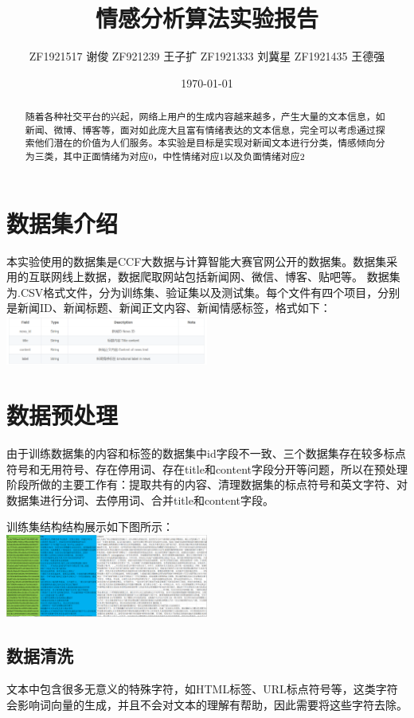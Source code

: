 \documentclass[twocolumn]{ctexart}
\begin{document}
\title{情感分析算法实验报告}
\author{ZF1921517 谢俊 ZF921239 王子扩 ZF1921333 刘冀星 ZF1921435 王德强}
\date{\today}
\maketitle



\begin{abstract}
随着各种社交平台的兴起，网络上用户的生成内容越来越多，产生大量的文本信息，如新闻、微博、博客等，面对如此庞大且富有情绪表达的文本信息，完全可以考虑通过探索他们潜在的价值为人们服务。本实验是目标是实现对新闻文本进行分类，情感倾向分为三类，其中正面情绪为对应0，中性情绪对应1以及负面情绪对应2
\end{abstract}


\section{数据集介绍}

本实验使用的数据集是CCF大数据与计算智能大赛官网公开的数据集。数据集采用的互联网线上数据，数据爬取网站包括新闻网、微信、博客、贴吧等。
数据集为.CSV格式文件，分为训练集、验证集以及测试集。每个文件有四个项目，分别是新闻ID、新闻标题、新闻正文内容、新闻情感标签，格式如下：
\includegraphics[width=0.5\textwidth]{p1.png}


\section{数据预处理}
由于训练数据集的内容和标签的数据集中id字段不一致、三个数据集存在较多标点符号和无用符号、存在停用词、存在title和content字段分开等问题，所以在预处理阶段所做的主要工作有：提取共有的内容、清理数据集的标点符号和英文字符、对数据集进行分词、去停用词、合并title和content字段。
\par 训练集结构结构展示如下图所示：\\
\includegraphics[width=0.5\textwidth]{p2.png}

\subsection{数据清洗}
\par 文本中包含很多无意义的特殊字符，如HTML标签、URL标点符号等，这类字符会影响词向量的生成，并且不会对文本的理解有帮助，因此需要将这些字符去除。
\end{document}
